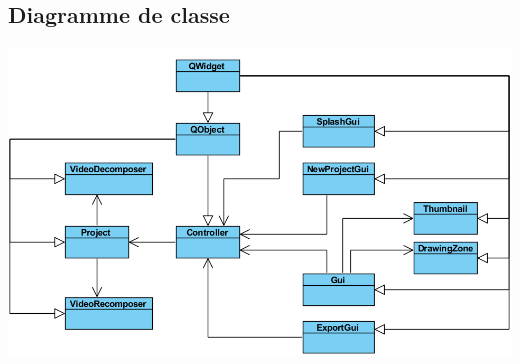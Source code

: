\newpage

\subsection{Diagramme de classe}
	\begin{center}
		\includegraphics[width=16cm]{./figures/diagramme.png}
	\end{center}
